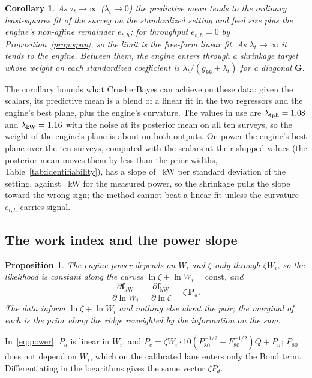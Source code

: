 \documentclass[journal]{IEEEtran}
\newtheorem{proposition}{Proposition}
\newtheorem{corollary}{Corollary}
\begin{document}
\begin{corollary}\label{cor:limits}
As $\tau_t\to\infty$ ($\lambda_t\to0$) the predictive mean tends to the ordinary least-squares fit of the survey on the
standardized setting and feed size plus the engine's non-affine remainder $e_{t,h}$; for throughput $e_{t,h}=0$ by
Proposition~\ref{prop:span}, so the limit is the free-form linear fit. As $\lambda_t\to\infty$ it tends to the engine.
Between them, the engine enters through a shrinkage target whose weight on each standardized coefficient is
$\lambda_t/(g_{kk}+\lambda_t)$ for a diagonal $\mathbf G$.
\end{corollary}

The corollary bounds what CrusherBayes can achieve on these data: given the scalars, its predictive mean is a blend of a
linear fit in the two regressors and the engine's best plane, plus the engine's curvature. The values in use are
$\lambda_{\mathrm{tph}}=1.08$ and $\lambda_{\mathrm{kW}}=1.16$ with the noise at its posterior mean on all ten surveys, so
the weight of the engine's plane is about \thWeightTph{} on both outputs. On power the engine's best plane over the ten
surveys, computed with the scalars at their shipped values (the posterior mean moves them by less than the prior
widths, Table~\ref{tab:identifiability}), has a slope of \thEngSlope~kW per standard deviation of the setting, against \thMeasSlope~kW for the measured power,
so the shrinkage pulls the slope toward the wrong sign; the method cannot beat a linear fit unless the curvature
$e_{t,h}$ carries signal.

\subsection{The work index and the power slope}

\begin{proposition}\label{prop:product}
The engine power depends on $W_i$ and $\zeta$ only through $\zeta W_i$, so the likelihood is constant along the curves
$\ln\zeta+\ln W_i=\text{const}$, and
\begin{equation}
\frac{\partial\mathbf f_{\mathrm{kW}}}{\partial\ln W_i}=\frac{\partial\mathbf f_{\mathrm{kW}}}{\partial\ln\zeta}=\zeta\,\mathbf P_d.
\label{eq:product}
\end{equation}
The data inform $\ln\zeta+\ln W_i$ and nothing else about the pair; the marginal of each is the prior along the ridge
reweighted by the information on the sum.
\end{proposition}
\begin{IEEEproof}
In~\eqref{eq:power}, $P_d$ is linear in $W_i$, and $P_c=\zeta W_i\cdot10(P_{80}^{-1/2}-F_{80}^{-1/2})Q+P_n$; $P_{80}$ does
not depend on $W_i$, which on the calibrated lane enters only the Bond term. Differentiating in the logarithms gives the same
vector $\zeta P_d$.
\end{IEEEproof}
\end{document}

